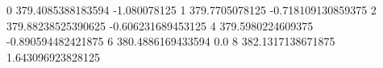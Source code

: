 0 379.4085388183594 -1.080078125
1 379.7705078125 -0.718109130859375
2 379.88238525390625 -0.606231689453125
4 379.5980224609375 -0.890594482421875
6 380.4886169433594 0.0
8 382.1317138671875 1.643096923828125
